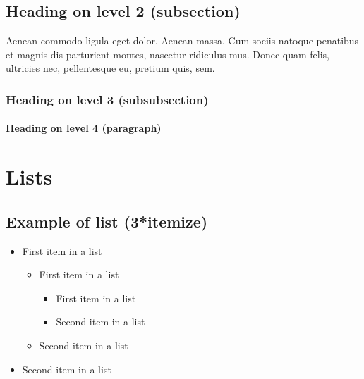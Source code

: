 \documentclass[paper=a4, fontsize=11pt]{scrartcl} %
\numberwithin{equation}{section} %
\numberwithin{figure}{section} %
\numberwithin{table}{section} %
\begin{document}
\subsection{Heading on level 2 (subsection)}

Aenean commodo ligula eget dolor. Aenean massa. Cum sociis natoque penatibus et magnis dis parturient montes, nascetur ridiculus mus. Donec quam felis, ultricies nec, pellentesque eu, pretium quis, sem.


\subsubsection{Heading on level 3 (subsubsection)}

\lipsum[3] %

\paragraph{Heading on level 4 (paragraph)}

\lipsum[6] %


\section{Lists}


\subsection{Example of list (3*itemize)}
\begin{itemize}
	\item First item in a list 
		\begin{itemize}
		\item First item in a list 
			\begin{itemize}
			\item First item in a list 
			\item Second item in a list 
			\end{itemize}
		\item Second item in a list 
		\end{itemize}
	\item Second item in a list 
\end{itemize}
\end{document}
